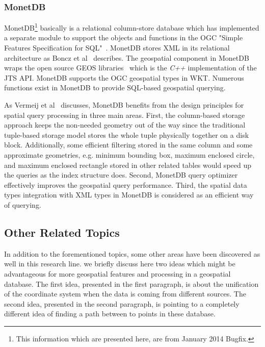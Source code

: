 \documentclass[a4paper,12pt]{article}
\begin{document}
\subsubsection{MonetDB}
MonetDB\footnote{This information which are presented here, are from January 2014 Bugfix.} basically is a relational column-store database which has implemented a separate module to support the objects and functions in the OGC "Simple Features Specification for SQL"~\cite{ogcsfs}. MonetDB stores XML in its relational architecture as Boncz et al~\cite{Boncz2006} describes. The geospatial component in MonetDB wraps the open source GEOS libraries~\cite{GEOS}
which is the \textit{C++} implementation of the JTS API. MonetDB supports the OGC geospatial types in WKT. Numerous functions exist in MonetDB to provide SQL-based geospatial querying. 

As Vermeij et al~\cite{MonetDB} discusses, MonetDB benefits from the design principles for spatial query processing in three main areas. First, the column-based storage approach keeps the non-needed geometry out of the way since the traditional tuple-based storage model stores the whole tuple physically together on a disk block. Additionally, some efficient filtering stored in the same column and some approximate geometries, e.g. minimum bounding box, maximum enclosed circle, and maximum enclosed rectangle stored in other related tables would speed up the queries as the index structure does. Second, MonetDB query optimizer effectively improves the geospatial query performance. Third, the spatial data types integration with XML types in MonetDB is considered as an efficient way of querying. 

\subsection{Other Related Topics}

In addition to the forementioned topics, some other areas have been discovered as well in this research line. 
we briefly discuss here two ideas which might be advantageous 
for more geospatial features and processing in a geospatial database.
The first idea, presented in the first paragraph, is about the unification of the coordinate system when the data
is coming from different sources.  The second idea, presented in the second paragraph, is pointing to a 
completely different idea of finding a path between to points in these database.
\end{document}
